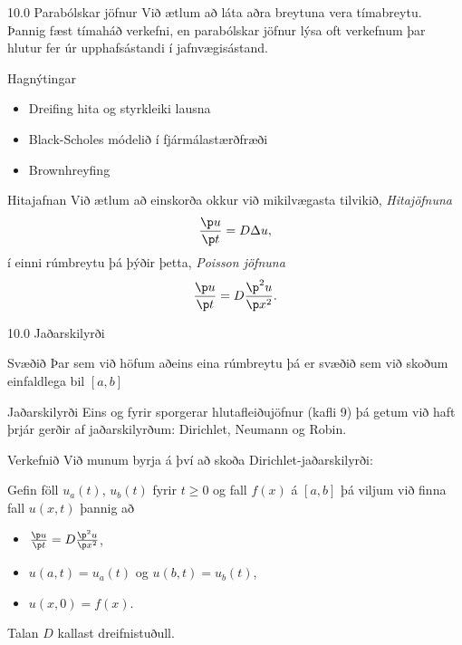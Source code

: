 \begin{frame}{10.0 Parabólskar jöfnur}
 Við ætlum að láta aðra breytuna vera tímabreytu. 
 Þannig fæst tímaháð verkefni, en parabólskar jöfnur lýsa oft verkefnum þar 
 hlutur fer úr upphafsástandi í jafnvægisástand. \pause
 
 \begin{block}{Hagnýtingar}
 \begin{itemize}
  \item Dreifing hita og styrkleiki lausna
  \item Black-Scholes módelið í fjármálastærðfræði
  \item Brownhreyfing
 \end{itemize}
 \end{block}
 
 \pause
 
 \begin{block}{Hitajafnan}
 Við ætlum að einskorða okkur við mikilvægasta tilvikið, \emph{Hitajöfnuna}
 $$
  \frac{\p u}{\p t} =  D \Delta u,
 $$\pause
 í einni rúmbreytu þá þýðir þetta, \emph{Poisson jöfnuna}
 $$
  \frac{\p u}{\p t} =  D\frac{\p^2 u}{\p x^2}.
 $$
 \end{block}
\end{frame}

\begin{frame}{10.0 Jaðarskilyrði}

\begin{block}{Svæðið}
 Þar sem við höfum aðeins eina rúmbreytu þá er svæðið sem við skoðum 
 einfaldlega bil $[a,b]$
\end{block}
  
\begin{block}{Jaðarskilyrði}
 Eins og fyrir sporgerar hlutafleiðujöfnur (kafli 9) þá getum við haft þrjár gerðir
 af jaðarskilyrðum: Dirichlet,
 Neumann og  Robin.
\end{block}

\begin{block}{Verkefnið}
Við munum byrja á því að skoða Dirichlet-jaðarskilyrði: \pause 

Gefin föll
$u_a(t)$, $u_b(t)$ fyrir $t\geq 0$ og fall $f(x)$ á $[a,b]$ þá viljum
við finna fall $u(x,t)$ þannig að \pause
\begin{itemize}
 \item $\frac{\p u}{\p t} =  D \frac{\p^2 u}{\p x^2}$, \pause
 \item $u(a,t) = u_a(t)$ og $u(b,t) = u_b(t)$, \pause
 \item $u(x,0) = f(x)$. \pause
\end{itemize}
Talan $D$ kallast dreifnistuðull.
\end{block}

\end{frame}

